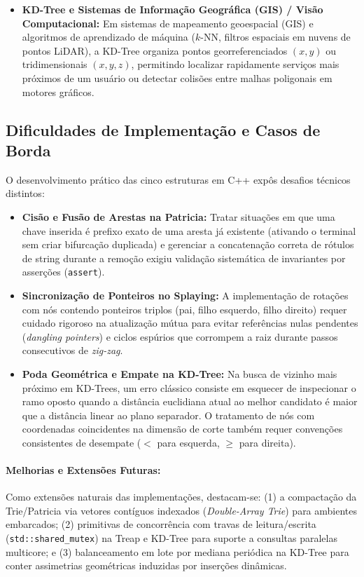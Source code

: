 \documentclass[11pt,a4paper]{article}
\begin{document}
\begin{itemize}[leftmargin=*]
  \item \textbf{KD-Tree e Sistemas de Informação Geográfica (GIS) / Visão Computacional:} Em sistemas de mapeamento geoespacial (GIS) e algoritmos de aprendizado de máquina ($k$-NN, filtros espaciais em nuvens de pontos LiDAR), a KD-Tree organiza pontos georreferenciados $(x, y)$ ou tridimensionais $(x, y, z)$, permitindo localizar rapidamente serviços mais próximos de um usuário ou detectar colisões entre malhas poligonais em motores gráficos.
\end{itemize}

\subsection{Dificuldades de Implementação e Casos de Borda}
O desenvolvimento prático das cinco estruturas em C++ expôs desafios técnicos distintos:
\begin{itemize}[leftmargin=*]
  \item \textbf{Cisão e Fusão de Arestas na Patricia:} Tratar situações em que uma chave inserida é prefixo exato de uma aresta já existente (ativando o terminal sem criar bifurcação duplicada) e gerenciar a concatenação correta de rótulos de string durante a remoção exigiu validação sistemática de invariantes por asserções (\texttt{assert}).
  \item \textbf{Sincronização de Ponteiros no Splaying:} A implementação de rotações com nós contendo ponteiros triplos (pai, filho esquerdo, filho direito) requer cuidado rigoroso na atualização mútua para evitar referências nulas pendentes (\textit{dangling pointers}) e ciclos espúrios que corrompem a raiz durante passos consecutivos de \textit{zig-zag}.
  \item \textbf{Poda Geométrica e Empate na KD-Tree:} Na busca de vizinho mais próximo em KD-Trees, um erro clássico consiste em esquecer de inspecionar o ramo oposto quando a distância euclidiana atual ao melhor candidato é maior que a distância linear ao plano separador. O tratamento de nós com coordenadas coincidentes na dimensão de corte também requer convenções consistentes de desempate ($<$ para esquerda, $\ge$ para direita).
\end{itemize}

\paragraph{Melhorias e Extensões Futuras:} Como extensões naturais das implementações, destacam-se: (1) a compactação da Trie/Patricia via vetores contíguos indexados (\textit{Double-Array Trie}) para ambientes embarcados; (2) primitivas de concorrência com travas de leitura/escrita (\texttt{std::shared\_mutex}) na Treap e KD-Tree para suporte a consultas paralelas multicore; e (3) balanceamento em lote por mediana periódica na KD-Tree para conter assimetrias geométricas induzidas por inserções dinâmicas.
\end{document}
